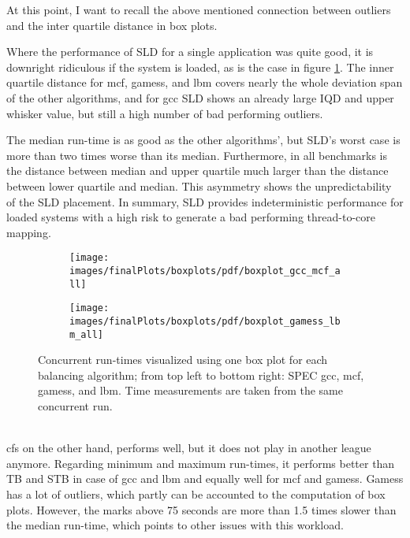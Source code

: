 At this point, I want to recall the above mentioned connection between outliers
and the inter quartile distance in box plots.

Where the performance of SLD for a single application was quite good, it is
downright ridiculous if the system is loaded, as is the case in figure
\ref{eval:fig:box_all}.
The inner quartile distance for mcf, gamess, and lbm covers nearly the whole
deviation span of the other algorithms, and for gcc SLD shows an already large
IQD and upper whisker value, but still a high number of bad performing outliers.

The median run-time is as good as the other algorithms', but SLD's worst case
is more than two times worse than its median.
Furthermore, in all benchmarks is the distance between median and upper quartile
much larger than the distance between lower quartile and median.
This asymmetry shows the unpredictability of the SLD placement.
In summary, SLD provides indeterministic performance for loaded systems with a
high risk to generate a bad performing thread-to-core mapping.
%
\begin{figure}[h!]
  \begin{subfigure}{\textwidth}
  \texttt{[image: images/finalPlots/boxplots/pdf/boxplot\_gcc\_mcf\_all]}
  \end{subfigure}
  \begin{subfigure}{\textwidth}
  \texttt{[image: images/finalPlots/boxplots/pdf/boxplot\_gamess\_lbm\_all]}
  \end{subfigure}
  \caption{Concurrent run-times visualized using one box plot for each balancing
    algorithm; from top left to bottom right: SPEC gcc, mcf, gamess, and lbm.
    Time measurements are taken from the same concurrent run.}
    \label{eval:fig:box_all}
\end{figure}
\\

\Gls{cfs} on the other hand, performs well, but it does not play in another
league anymore.
Regarding minimum and maximum run-times, it performs better than TB and STB in
case of gcc and lbm and equally well for mcf and gamess.
Gamess has a lot of outliers, which partly can be accounted to the computation
of box plots.
However, the marks above 75 seconds are more than 1.5 times slower than the
median run-time, which points to other issues with this workload.

